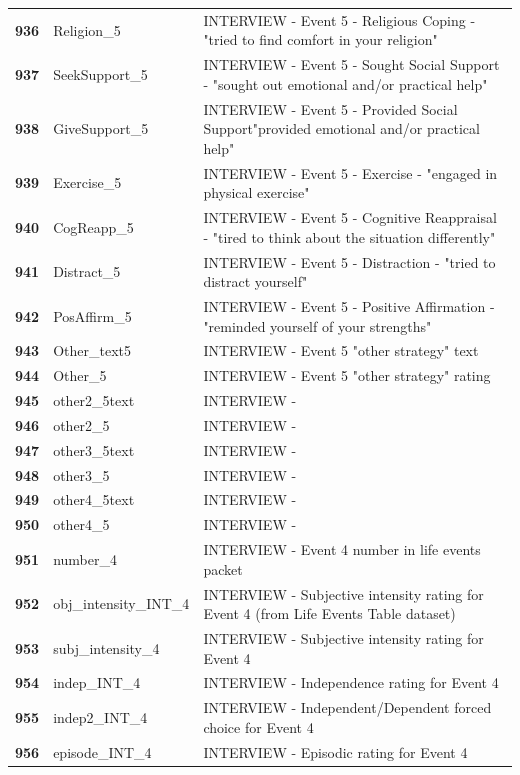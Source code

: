 \documentclass[
  letterpaper,
  DIV=11,
  numbers=noendperiod]{scrartcl}
\begin{document}
\begin{longtable}[t]{>{}cll}
\addlinespace
\textbf{936} & Religion\_5 & INTERVIEW - Event 5 - Religious Coping - "tried to find comfort in your religion"\\
\textbf{937} & SeekSupport\_5 & INTERVIEW - Event 5 - Sought Social Support - "sought out emotional and/or practical help"\\
\textbf{938} & GiveSupport\_5 & INTERVIEW - Event 5 - Provided Social Support"provided emotional and/or practical help"\\
\textbf{939} & Exercise\_5 & INTERVIEW - Event 5 - Exercise - "engaged in physical exercise"\\
\textbf{940} & CogReapp\_5 & INTERVIEW - Event 5 - Cognitive Reappraisal - "tired to think about the situation differently"\\
\addlinespace
\textbf{941} & Distract\_5 & INTERVIEW - Event 5 - Distraction - "tried to distract yourself"\\
\textbf{942} & PosAffirm\_5 & INTERVIEW - Event 5 - Positive Affirmation - "reminded yourself of your strengths"\\
\textbf{943} & Other\_text5 & INTERVIEW - Event 5 "other strategy" text\\
\textbf{944} & Other\_5 & INTERVIEW - Event 5 "other strategy" rating\\
\textbf{945} & other2\_5text & INTERVIEW -\\
\addlinespace
\textbf{946} & other2\_5 & INTERVIEW -\\
\textbf{947} & other3\_5text & INTERVIEW -\\
\textbf{948} & other3\_5 & INTERVIEW -\\
\textbf{949} & other4\_5text & INTERVIEW -\\
\textbf{950} & other4\_5 & INTERVIEW -\\
\addlinespace
\textbf{951} & number\_4 & INTERVIEW - Event 4 number in life events packet\\
\textbf{952} & obj\_intensity\_INT\_4 & INTERVIEW - Subjective intensity rating for Event 4 (from Life Events Table dataset)\\
\textbf{953} & subj\_intensity\_4 & INTERVIEW - Subjective intensity rating for Event 4\\
\textbf{954} & indep\_INT\_4 & INTERVIEW - Independence rating for Event 4\\
\textbf{955} & indep2\_INT\_4 & INTERVIEW - Independent/Dependent forced choice for Event 4\\
\addlinespace
\textbf{956} & episode\_INT\_4 & INTERVIEW - Episodic rating for Event 4\\

\end{longtable}
\end{document}
